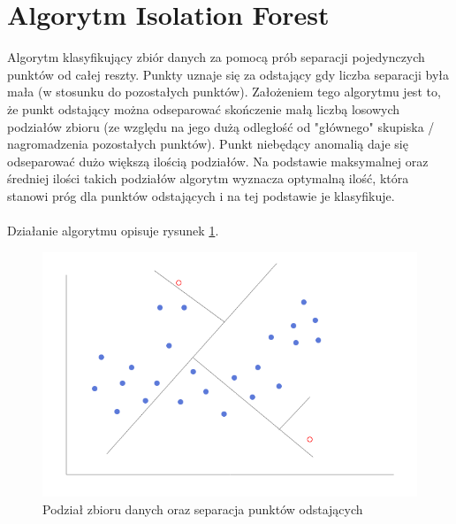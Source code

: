\documentclass[eng,printmode]{mgr}
\begin{document}
\section{Algorytm Isolation Forest}
Algorytm klasyfikujący zbiór danych za pomocą prób separacji pojedynczych punktów od całej reszty. Punkty uznaje się za odstający gdy liczba separacji była mała (w stosunku do pozostałych punktów). Założeniem tego algorytmu jest to, że punkt odstający można odseparować skończenie małą liczbą losowych podziałów zbioru (ze względu na jego dużą odległość od "głównego" skupiska / nagromadzenia pozostałych punktów). Punkt niebędący anomalią daje się odseparować dużo większą ilością podziałów. Na podstawie maksymalnej oraz średniej ilości takich podziałów algorytm wyznacza optymalną ilość, która stanowi próg dla punktów odstających i na tej podstawie je klasyfikuje.
\\\\
Działanie algorytmu opisuje rysunek \ref{fig:isolation_forest}.

\begin{figure}[H]
  \begin{center}
  \includegraphics[scale=0.7]{isolation_forest}
  \end{center}
  \caption{Podział zbioru danych oraz separacja punktów odstających}
  \label{fig:isolation_forest}
\end{figure}
\end{document}
